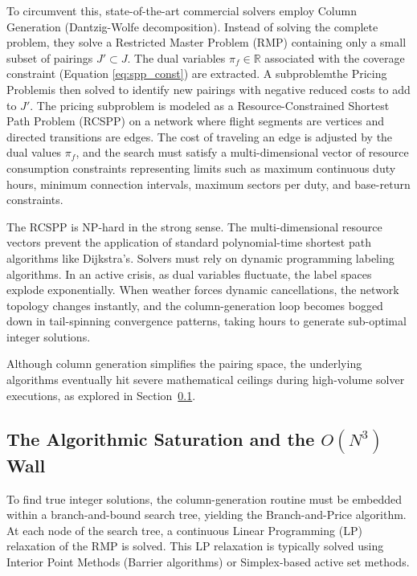 \documentclass[11pt,a4paper]{book}
\begin{document}
To circumvent this, state-of-the-art commercial solvers employ Column Generation (Dantzig-Wolfe decomposition). Instead of solving the complete problem, they solve a Restricted Master Problem (RMP) containing only a small subset of pairings $J' \subset J$. The dual variables $\pi_f \in \mathbb{R}$ associated with the coverage constraint (Equation \ref{eq:spp_const}) are extracted. A subproblemthe Pricing Problemis then solved to identify new pairings with negative reduced costs to add to $J'$. The pricing subproblem is modeled as a Resource-Constrained Shortest Path Problem (RCSPP) on a network where flight segments are vertices and directed transitions are edges. The cost of traveling an edge is adjusted by the dual values $\pi_f$, and the search must satisfy a multi-dimensional vector of resource consumption constraints representing limits such as maximum continuous duty hours, minimum connection intervals, maximum sectors per duty, and base-return constraints.

The RCSPP is NP-hard in the strong sense. The multi-dimensional resource vectors prevent the application of standard polynomial-time shortest path algorithms like Dijkstra's. Solvers must rely on dynamic programming labeling algorithms. In an active crisis, as dual variables fluctuate, the label spaces explode exponentially. When weather forces dynamic cancellations, the network topology changes instantly, and the column-generation loop becomes bogged down in tail-spinning convergence patterns, taking hours to generate sub-optimal integer solutions.

Although column generation simplifies the pairing space, the underlying algorithms eventually hit severe mathematical ceilings during high-volume solver executions, as explored in Section~\ref{sec:algorithmic_saturation}.

\subsection{The Algorithmic Saturation and the $O(N^3)$ Wall}\label{sec:algorithmic_saturation}

To find true integer solutions, the column-generation routine must be embedded within a branch-and-bound search tree, yielding the Branch-and-Price algorithm. At each node of the search tree, a continuous Linear Programming (LP) relaxation of the RMP is solved. This LP relaxation is typically solved using Interior Point Methods (Barrier algorithms) or Simplex-based active set methods.
\end{document}
